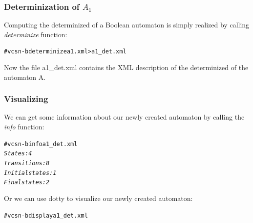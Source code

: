 \subsubsection{Determinization of $A_1$}
Computing the determinized of a Boolean automaton is simply realized
by calling \textit{determinize} function:
\begin{alltt}
# vcsn-b determinize a1.xml > a1\_det.xml
\end{alltt}
Now the file a1\_det.xml contains the XML description of the
determinized of the automaton A.

\subsubsection{Visualizing}

We can get some information about our newly created automaton by calling
the \textit{info} function:
\begin{alltt}
# vcsn-b info a1\_det.xml
\textit{States: 4
Transitions: 8
Initial states: 1
Final states: 2}
\end{alltt}
Or we can use dotty to visualize our newly created automaton:
\begin{alltt}
# vcsn-b display a1\_det.xml
\end{alltt}

